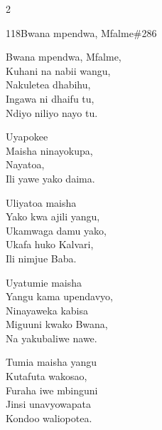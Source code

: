 \documentclass{article}
\begin{document}
\begin{multicols}{2}
\begin{hymn}{118}{Bwana mpendwa, Mfalme}{\#286}
\begin{stanza}
Bwana mpendwa, Mfalme,\\
Kuhani na nabii wangu,\\
Nakuletea dhabihu,\\
Ingawa ni dhaifu tu,\\
Ndiyo niliyo nayo tu.
\end{stanza}
\begin{chorus}
Uyapokee\\
Maisha ninayokupa,\\
Nayatoa,\\
Ili yawe yako daima.
\end{chorus}
\begin{stanza}
Uliyatoa maisha\\
Yako kwa ajili yangu,\\
Ukamwaga damu yako,\\
Ukafa huko Kalvari,\\
Ili nimjue Baba.
\end{stanza}
\begin{stanza}
Uyatumie maisha\\
Yangu kama upendavyo,\\
Ninayaweka kabisa\\
Miguuni kwako Bwana,\\
Na yakubaliwe nawe.
\end{stanza}
\begin{stanza}
Tumia maisha yangu\\
Kutafuta wakosao,\\
Furaha iwe mbinguni\\
Jinsi unavyowapata\\
Kondoo waliopotea.
\end{stanza}
\end{hymn}


\end{multicols}
\end{document}
